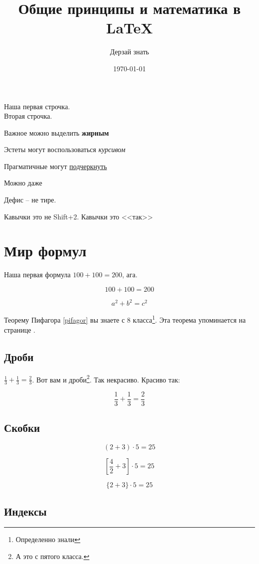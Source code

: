 \documentclass[a4paper,12pt]{article} %
\author{Дерзай знать}
\title{Общие принципы и математика в \LaTeX{}}
\date{\today}
\begin{document}

\maketitle
\newpage

Наша первая строчка.\\[2cm]
Вторая \hspace{20pt} строчка.

Важное можно выделить \textbf{жирным}

Эстеты могут воспользоваться \textit{курсивом}

Прагматичные могут \underline{подчеркнуть}

Можно даже 

Дефис -- не тире.

Кавычки это не Shift+2. Кавычки это <<так>>

\section{Мир формул}

Наша первая формула $100+100=200$, ага.

\[ 100+100=200 \]

\begin{equation}\label{pifagor}
a^2+b^2=c^2
\end{equation}

Теорему Пифагора \eqref{pifagor} вы знаете с 8 класса\footnote{Определенно знали}. Эта теорема упоминается на странице \pageref{pifagor}.

\subsection{Дроби}

$\frac{1}{3}+\frac{1}{3}=\frac{2}{3}$. Вот вам и дроби\footnote{А это с пятого класса.}. {\scriptsize Так некрасиво.} {\Large Красиво так}:

\[ \frac{1}{3}+\frac{1}{3}=\frac{2}{3} \]


\subsection{Скобки}

\[ (2+3)\cdot 5=25 \]

\[ \left[\frac{4}{2}+3\right]\cdot 5=25 \]

\[ \{2+3\}\cdot 5=25 \]

\subsection{Индексы}
\end{document}
